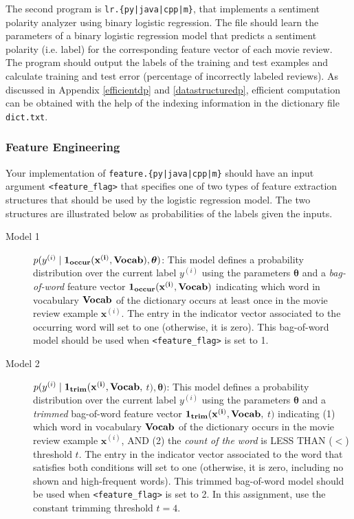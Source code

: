 \documentclass[11pt]{article}
\numberwithin{equation}{section} %
\numberwithin{figure}{section} %
\numberwithin{table}{section} %
\def\x{\mathbf x}
\newcommand{\thetav     }{\boldsymbol \theta     }
\begin{document}
The second program is \texttt{lr.\{py|java|cpp|m\}}, that implements a sentiment polarity analyzer using binary logistic regression. The file should learn the parameters of a binary logistic regression model that predicts a sentiment polarity (i.e. label) for the corresponding feature vector of each movie review. The program should output the labels of the training and test examples and calculate training and test error (percentage of incorrectly labeled reviews). As discussed in Appendix \ref{efficientdp} and \ref{datastructuredp}, efficient computation can be obtained with the help of the indexing information in the dictionary file \lstinline{dict.txt}.

\subsubsection{Feature Engineering} \label{feature}

Your implementation of \texttt{feature.\{py|java|cpp|m\}} should have an input argument \texttt{<feature\_flag>} that specifies one of two types of feature extraction structures that should be used by the logistic regression model. The two structures are illustrated below as probabilities of the labels given the inputs.

\begin{description}
    \item[Model 1] $p(y^{(i)} \mid \bf{1}_{occur}( \x^{(i)},Vocab), \thetav)$: This model defines a probability distribution over the current label $y^{(i)}$ using the parameters $\thetav$ and a \emph{bag-of-word} feature vector $\bf{1}_{occur}( \x^{(i)},Vocab)$ indicating which word in vocabulary $\bf{Vocab}$ of the dictionary occurs at least once in the movie review example $\x^{(i)}$. The entry in the indicator vector associated  to the occurring word will set to one (otherwise, it is zero). This bag-of-word model should be used when \texttt{<feature\_flag>} is set to 1.
    
    \item[Model 2] $p(y^{(i)} \mid \bf{1}_{trim}(  \x^{(i)},Vocab,$ $t), \thetav)$: This model defines a probability distribution over the current label $y^{(i)}$ using the parameters $\thetav$ and a \emph{trimmed} bag-of-word feature vector $\bf{1}_{trim}( \x^{(i)},Vocab,$ $t)$ indicating  (1) which word in vocabulary $\bf{Vocab}$ of the dictionary occurs in the movie review example $\x^{(i)}$, AND (2) the \emph{count of the word} is LESS THAN ($<$) threshold $t$. The entry in the indicator vector associated  to the word that satisfies both conditions will set to one (otherwise, it is zero, including no shown and high-frequent words). This trimmed bag-of-word model should be used when \texttt{<feature\_flag>} is set to 2. In this assignment, use the constant trimming threshold $t=4$.
    
\end{description}
\end{document}
